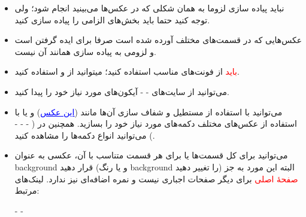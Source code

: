 \documentclass[]{article}
\begin{document}
\begin{itemize}
\item
نباید پیاده سازی لزوما به همان شکلی که در عکس‌ها می‌بینید انجام شود؛ ولی توجه کنید حتما باید بخش‌های الزامی را پیاده سازی کنید.

\item
عکس‌هایی که در قسمت‌های مختلف آورده شده است صرفا برای ایده گرفتن است و لزومی به پیاده سازی همانند آن نیست.


\item
\textcolor{red}{باید}
 از فونت‌های مناسب استفاده کنید؛ میتوانید از
   \href{https://www.kenney.nl/assets/kenney-fonts}{\textcolor{blue}{\underline{}}}
    و
     \href{https://www.behance.net/collection/4860923/Free-Fonts}{\textcolor{blue}{\underline{}}}
    استفاده کنید.

\item

می‌توانید از سایت‌های
 \href{https://www.flaticon.com/}{\textcolor{blue}{\underline{}}} 
 - 
 \href{https://icons8.com/}{\textcolor{blue}{\underline{}}}
  -
   \href{https://www.iconninja.com/}{\textcolor{blue}{\underline{}}}
   آیکون‌های مورد نیاز خود را پیدا کنید.

\item

می‌توانید با استفاده از مستطیل و شفاف سازی آن‌ها مانند
 (\href{https://raw.githubusercontent.com/titansarus/Documents/master/phase_2/main/images/img1.jpg}{\textcolor{blue}{\underline{{این عکس}}}})  و یا با استفاده از عکس‌های مختلف  دکمه‌های مورد نیاز خود را بسازید. همچنین در 
  (
\href{https://hannemann.itch.io/ui-button-pack-free}{\textcolor{blue}{\underline{}}}
 - \href{https://www.vecteezy.com/vector-art/116983-digital-game-button}{\textcolor{blue}{\underline{}}}
  -
  \href{https://www.clickminded.com/button-generator/}{\textcolor{blue}{\underline{}}} -
   \href{https://pngtree.com/free-png-vectors/hexagon}{\textcolor{blue}{\underline{}}}
   ) می‌توانید انواع دکمه‌ها را مشاهده کنید.


\item

می‌توانید برای کل قسمت‌ها یا برای هر قسمت متناسب با آن، عکسی به عنوان background قرار دهید (و یا رنگ background را تغییر دهید) البته این مورد به جز
\textcolor{red}{صفحهٔ اصلی}
  برای دیگر صفحات اجباری نیست و نمره اضافه‌ای نیز ندارد. لینک‌های مرتبط:

\href{https://pngtree.com/free-backgrounds}{\textcolor{blue}{\underline{}}} 
-
 \href{https://raw.githubusercontent.com/titansarus/Documents/master/phase_2/main/images/img2.jpg}{\textcolor{blue}{\underline{}}}
 -
  \href{https://github.com/titansarus/Documents/blob/master/phase_2/main/images/img3.jpg}{\textcolor{blue}{\underline{}}} 



\end{itemize}
\end{document}
